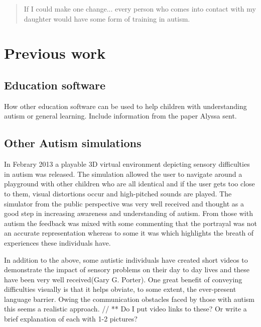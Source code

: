 \documentclass[11pt]{report}
\begin{document}
\begin{quote}
If I could make one change... every person who comes into contact with my daughter would have some form of training in autism.\cite{nasschool}
\end{quote}

\section{Previous work}

\subsection{Education software}
How other education software can be used to help children with understanding autism or general learning. Include information from the paper Alyssa sent.

\subsection{Other Autism simulations}

In Febrary 2013 a playable 3D virtual environment depicting sensory difficulties in autism was released. The simulation allowed the user to navigate around a playground with other children who are all identical and if the user gets too close to them, visual distortions occur and high-pitched sounds are played. The simulator from the public perspective was very well received and thought as a good step in increasing awareness and understanding of autism. From those with autism the feedback was mixed with some commenting that the portrayal was not an accurate representation whereas to some it was which highlights the breath of experiences these individuals have.

In addition to the above, some autistic individuals have created short videos to demonstrate the impact of sensory problems on their day to day lives and these have been very well received(Gary G. Porter). One great benefit of conveying difficulties visually is that it helps obviate, to some extent, the ever-present language barrier. Owing the communication obstacles faced by those with autism this seems a realistic approach. // ** Do I put video links to these? Or write a brief explanation of each with 1-2 pictures?
\end{document}
